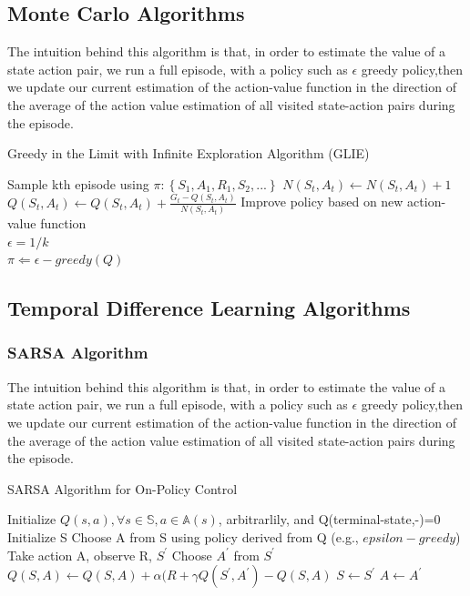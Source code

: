 \documentclass[12pt,a4paper]{article}
\begin{document}
\subsection{Monte Carlo Algorithms}

The intuition behind this algorithm is that, in order to estimate the value of a state action pair, we run a full episode, with a policy such as $\epsilon$ greedy policy,then we update our current estimation of the action-value function in the direction of the average of the action value estimation of all visited state-action pairs during the episode.

\begin{algorithm}
\caption{Greedy in the Limit with Infinite Exploration Algorithm (GLIE)}
\label{alg:glie}
\begin{algorithmic}[1]
\State Sample kth episode using $\pi: \left\{S_{1}, A_{1}, R_{1}, S_{2}, ...\right\}$
\State $N(S_{t}, A_{t}) \leftarrow N(S_{t}, A_{t}) + 1$
\State $Q(S_{t}, A_{t}) \leftarrow Q(S_{t}, A_{t}) + \frac{G_{t} - Q(S_{t}, A_{t})}{N(S_{t}, A_{t})}$
\EndFor
\State Improve policy based on new action-value function
\\ $\epsilon = 1/k $
\\ $\pi \Leftarrow \epsilon-greedy(Q) $
\end{algorithmic}
\end{algorithm}



\subsection{Temporal Difference Learning Algorithms}
\subsubsection{SARSA Algorithm}


The intuition behind this algorithm is that, in order to estimate the value of a state action pair, we run a full episode, with a policy such as $\epsilon$ greedy policy,then we update our current estimation of the action-value function in the direction of the average of the action value estimation of all visited state-action pairs during the episode.


\begin{algorithm}
\caption{SARSA Algorithm for On-Policy Control}
\label{alg:sarsa}
\begin{algorithmic}[1]
\State Initialize $Q(s,a),\forall s \in \mathbb{S}, a \in \mathbb{A}(s)$, arbitrarlily, and Q(terminal-state,-)=0
\State Initialize S
\State Choose A from S using policy derived from Q (e.g., $epsilon-greedy$)
\State Take action A, observe R, $S^{\prime}$
\State Choose $A^{\prime}$ from $S^{\prime}$
\State $Q(S,A) \leftarrow Q(S,A) + \alpha(R + \gamma Q(S^{\prime}, A^{\prime}) - Q(S, A)$
\State $S \leftarrow S^{\prime}$
\State $A \leftarrow A^{\prime}$
\EndFor
\EndFor
\end{algorithmic}
\end{algorithm}
\end{document}
